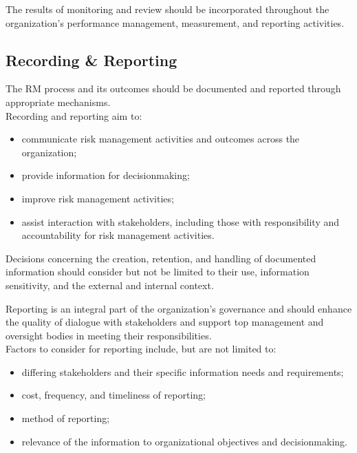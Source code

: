 \documentclass[letterpaper,10pt,english]{jupyterBook}
\begin{document}
\sphinxAtStartPar
The results of monitoring and review should be incorporated throughout the organization’s performance management, measurement, and reporting activities.


\subsection{Recording \& Reporting}
\label{\detokenize{PM/rm:recording-reporting}}
\sphinxAtStartPar
The RM process and its outcomes should be documented and reported through appropriate mechanisms. \\
Recording and reporting aim to:
\begin{itemize}
\item {} 
\sphinxAtStartPar
communicate risk management activities and outcomes across the organization;

\item {} 
\sphinxAtStartPar
provide information for decision\sphinxhyphen{}making;

\item {} 
\sphinxAtStartPar
improve risk management activities;

\item {} 
\sphinxAtStartPar
assist interaction with stakeholders, including those with responsibility and accountability for risk management activities.

\end{itemize}

\sphinxAtStartPar
Decisions concerning the creation, retention, and handling of documented information should consider but not be limited to their use, information sensitivity, and the external and internal context.

\sphinxAtStartPar
Reporting is an integral part of the organization’s governance and should enhance the quality of dialogue with stakeholders and support top management and oversight bodies in meeting their responsibilities. \\
Factors to consider for reporting include, but are not limited to:
\begin{itemize}
\item {} 
\sphinxAtStartPar
differing stakeholders and their specific information needs and requirements;

\item {} 
\sphinxAtStartPar
cost, frequency, and timeliness of reporting;

\item {} 
\sphinxAtStartPar
method of reporting;

\item {} 
\sphinxAtStartPar
relevance of the information to organizational objectives and decision\sphinxhyphen{}making.

\end{itemize}
\end{document}
